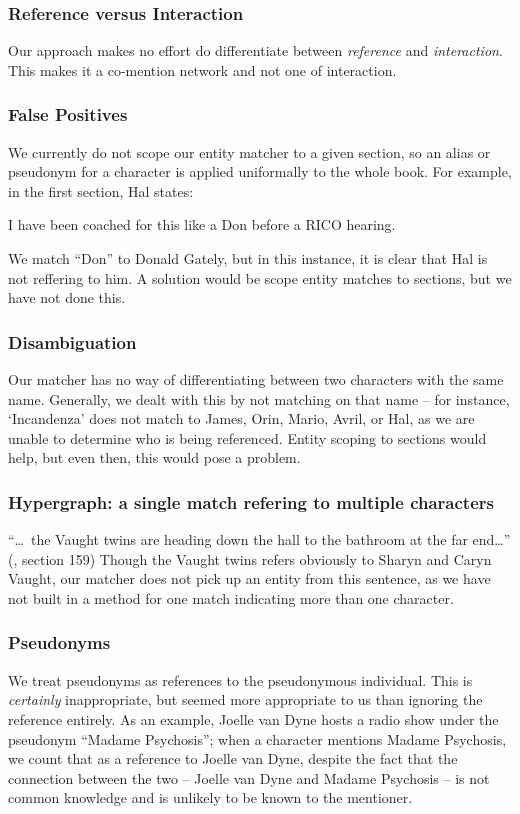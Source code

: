 \subsubsection{Reference versus Interaction}
Our approach makes no effort do differentiate between \textit{reference} and \textit{interaction}. This makes it a co-mention network and not one of interaction.

\subsubsection{False Positives}
We currently do not scope our entity matcher to a given section, so an alias or pseudonym for a character is applied uniformally to the whole book. For example, in the first section, Hal states:

\begin{displayquote}
I have been coached for this like a Don before a RICO hearing. 
\end{displayquote}

We match ``Don'' to Donald Gately, but in this instance, it is clear that Hal is not reffering to him. A solution would be scope entity matches to sections, but we have not done this.

\subsubsection{Disambiguation}
Our matcher has no way of differentiating between two characters with the same name. Generally, we dealt with this by not matching on that name -- for instance, `Incandenza' does not match to James, Orin, Mario, Avril, or Hal, as we are unable to determine who is being referenced. Entity scoping to sections would help, but even then, this would pose a problem.

\subsubsection{Hypergraph: a single match refering to multiple characters}
``\ldots~the Vaught twins are heading down the hall to the bathroom at the far end\ldots'' (\infinitejest, section 159) Though the Vaught twins refers obviously to Sharyn and Caryn Vaught, our matcher does not pick up an entity from this sentence, as we have not built in a method for one match indicating more than one character.

\subsubsection{Pseudonyms}
We treat pseudonyms as references to the pseudonymous individual. This is \textit{certainly} inappropriate, but seemed more appropriate to us than ignoring the reference entirely. As an example, Joelle van Dyne hosts a radio show under the pseudonym ``Madame Psychosis''; when a character mentions Madame Psychosis, we count that as a reference to Joelle van Dyne, despite the fact that the connection between the two -- Joelle van Dyne and Madame Psychosis -- is not common knowledge and is unlikely to be known to the mentioner.

